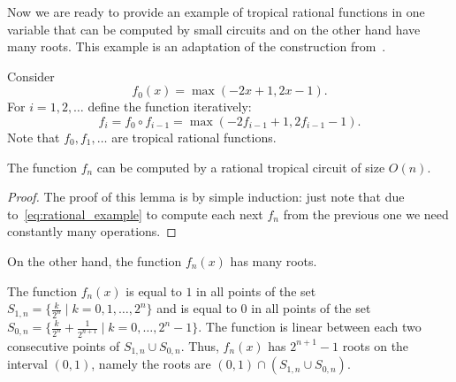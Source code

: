 \documentclass[11pt]{article}
\newcommand{\bb}[1]{\mathbb{#1}}
\begin{document}
Now we are ready to provide an example of tropical rational functions in one variable that can be computed by small circuits and on the other hand have many roots. This example is an adaptation of the construction from~\cite{montufar2014}.

Consider 
\begin{equation} \label{eq:rational_example_0}
f_0(x)= \max(-2x+1, 2x - 1).
\end{equation}
For $i=1,2, \ldots$ define the function iteratively:
\begin{equation}\label{eq:rational_example}
f_{i} =f_{0}\circ f_{i-1} = \max(-2f_{i-1} + 1, 2f_{i-1} - 1).
\end{equation}
Note that $f_0, f_1, \ldots$ are tropical rational functions.


\begin{lemma}
The function $f_n$ can be computed by a rational tropical circuit of size $O(n)$.
\end{lemma}

\begin{proof}
The proof of this lemma is by simple induction: just note that due to~\eqref{eq:rational_example} to compute each next $f_n$ from the previous one we need constantly many operations.
\end{proof}

On the other hand, the function $f_n(x)$ has many roots.

\begin{theorem} \label{thm:rational_roots}
The function $f_{n}(x)$ is equal to $1$ in all points of the set  $S_{1,n} = \{\frac{k}{2^{n}} \mid k = 0, 1,\ldots, 2^n\}$ and is equal to $0$ in all points of the set $S_{0,n} = \{ \frac{k}{2^n} + \frac{1}{2^{n+1}} \mid k=0,\ldots, 2^{n}-1\}$. The function is linear between each two consecutive points of $S_{1,n} \cup S_{0,n}$. Thus, $f_{n}(x)$ has $2^{n+1}-1$ roots on the interval $(0,1)$, namely the roots are $(0,1) \cap (S_{1,n} \cup S_{0,n})$.
\end{theorem}
\end{document}
